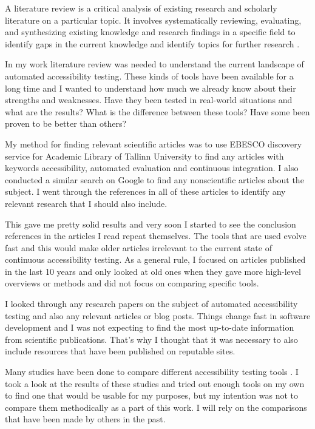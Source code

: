 \documentclass{master_thesis}
\begin{document}
A literature review is a critical analysis of existing research and scholarly literature on a particular topic. It involves systematically reviewing, evaluating, and synthesizing existing knowledge and research findings in a specific field to identify gaps in the current knowledge and identify topics for further research \citep{Luft2022}.

In my work literature review was needed to understand the current landscape of automated accessibility testing. These kinds of tools have been available for a long time and I wanted to understand how much we already know about their strengths and weaknesses. Have they been tested in real-world situations and what are the results? What is the difference between these tools? Have some been proven to be better than others?

My method for finding relevant scientific articles was to use EBESCO discovery service for Academic Library of Tallinn University to find any articles with keywords accessibility, automated evaluation and continuous integration. I also conducted a similar search on Google to find any nonscientific articles about the subject. I went through the references in all of these articles to identify any relevant research that I should also include.

This gave me pretty solid results and very soon I started to see the conclusion references in the articles I read repeat themselves. The tools that are used evolve fast and this would make older articles irrelevant to the current state of continuous accessibility testing. As a general rule, I focused on articles published in the last 10 years and only looked at old ones when they gave more high-level overviews or methods and did not focus on comparing specific tools.

I looked through any research papers on the subject of automated accessibility testing and also any relevant articles or blog posts. Things change fast in software development and I was not expecting to find the most up-to-date information from scientific publications. That's why I thought that it was necessary to also include resources that have been published on reputable sites.

Many studies have been done to compare different accessibility testing tools \citep{Alsaeedi2020, Ismailova2022, Sane2021, Vigo2013, RybinKoob2022, Duran2017}. I took a look at the results of these studies and tried out enough tools on my own to find one that would be usable for my purposes, but my intention was not to compare them methodically as a part of this work. I will rely on the comparisons that have been made by others in the past.
\end{document}
